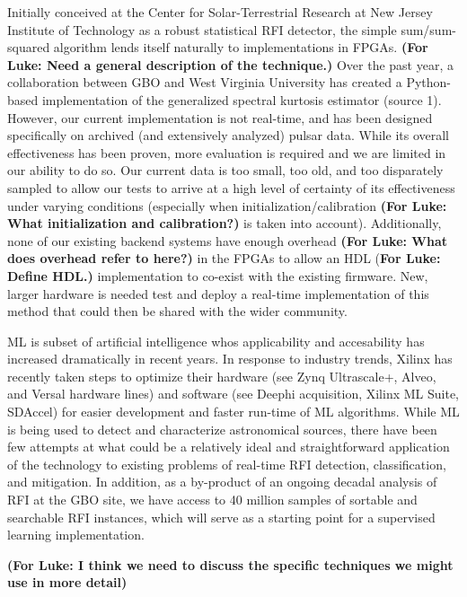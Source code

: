 \documentclass[10pt]{myNSF}
\begin{document}
 Initially conceived at the Center for
Solar-Terrestrial Research at New Jersey Institute of Technology as a
robust statistical RFI detector, the simple sum/sum-squared algorithm
lends itself naturally to implementations in FPGAs. \textbf{(For Luke:
  Need a general description of the technique.)} Over the past year, a
collaboration between GBO and West Virginia University has created a
Python-based implementation of the generalized spectral kurtosis
estimator (source 1). However, our current implementation is not
real-time, and has been designed specifically on archived (and
extensively analyzed) pulsar data.  While its overall effectiveness
has been proven, more evaluation is required and we are limited in our
ability to do so.  Our current data is too small, too old, and too
disparately sampled to allow our tests to arrive at a high level of
certainty of its effectiveness under varying conditions (especially
when initialization/calibration \textbf{(For Luke: What initialization
  and calibration?)} is taken into account). Additionally, none of our
existing backend systems have enough overhead \textbf{(For Luke: What
  does overhead refer to here?)} in the FPGAs to allow an HDL
(\textbf{For Luke: Define HDL.)}  implementation to co-exist with the
existing firmware.  New, larger hardware is needed test and deploy a
real-time implementation of this method that could then be shared with
the wider community.

 ML is subset of artificial intelligence
whos applicability and accesability has increased dramatically in
recent years. In response to industry trends, Xilinx has recently
taken steps to optimize their hardware (see Zynq Ultrascale+, Alveo,
and Versal hardware lines) and software (see Deephi acquisition,
Xilinx ML Suite, SDAccel) for easier development and faster run-time
of ML algorithms.  While ML is being used to detect and characterize
astronomical sources, there have been few attempts at what could be a
relatively ideal and straightforward application of the technology to
existing problems of real-time RFI detection, classification, and
mitigation.  In addition, as a by-product of an ongoing decadal
analysis of RFI at the GBO site, we have access to 40 million samples
of sortable and searchable RFI instances, which will serve as a
starting point for a supervised learning implementation.

\textbf{(For Luke: I think we need to discuss the specific techniques
  we might use in more detail)}
\end{document}
